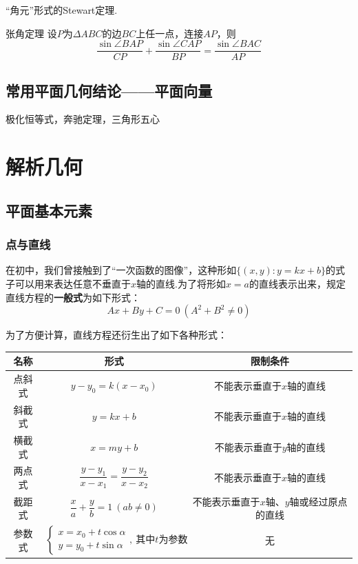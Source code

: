 \documentclass[lang=cn, zihao=5]{elegantbook}
\begin{document}
“角元”形式的Stewart定理.

\begin{theorem}{张角定理}
    设$P$为$\Delta ABC$的边$BC$上任一点，连接$AP$，则$$\frac{\sin \angle BAP}{CP} + \frac{\sin \angle CAP}{BP} = \frac{\sin \angle BAC}{AP}$$
\end{theorem}

\section{常用平面几何结论——平面向量}

极化恒等式，奔驰定理，三角形五心

\chapter{解析几何}

\section{平面基本元素}

\subsection{点与直线}

在初中，我们曾接触到了“一次函数的图像”，这种形如$\{ (x,y):y=kx+b \}$的式子可以用来表达任意不垂直于$x$轴的直线.为了将形如$x=a$的直线表示出来，规定直线方程的\textbf{一般式}为如下形式：$$Ax+By+C=0~(A^2+B^2 \neq 0)$$

为了方便计算，直线方程还衍生出了如下各种形式：

\begin{table}[h]
	\centering
	\renewcommand\arraystretch{1.5}
	\begin{tabular}{ccc}
		\toprule
		名称&形式&限制条件 \\
		\midrule
		点斜式 & $y-y_0=k(x-x_0)$ & 不能表示垂直于$x$轴的直线 \\
		斜截式 & $y=kx+b$ & 不能表示垂直于$x$轴的直线 \\
		横截式 & $x=my+b$ & 不能表示垂直于$y$轴的直线 \\
		两点式 & $\dfrac{y-y_1}{x-x_1}=\dfrac{y-y_2}{x-x_2}$ & 不能表示垂直于$x$轴的直线 \\
		截距式 & $\dfrac{x}{a}+\dfrac{y}{b}=1~(ab \neq 0)$ & 不能表示垂直于$x$轴、$y$轴或经过原点的直线 \\
		参数式 & $\begin{cases}
			x=x_0+t\cos \alpha \\
			y=y_0+t\sin \alpha
		\end{cases},~\textit{其中}t\textit{为参数}$ & 无 \\
		\bottomrule
	\end{tabular}
\end{table}
\end{document}
